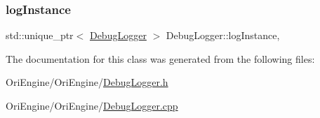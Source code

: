 \hypertarget{class_ori_engine_1_1_debug_logger_a4ce97f44559d7b62a2e6a535b34ce3f5}{}\label{class_ori_engine_1_1_debug_logger_a4ce97f44559d7b62a2e6a535b34ce3f5} 
\subsubsection{\texorpdfstring{log\+Instance}{logInstance}}
{\footnotesize\ttfamily std\+::unique\+\_\+ptr$<$ \hyperlink{class_ori_engine_1_1_debug_logger}{Debug\+Logger} $>$ Debug\+Logger\+::log\+Instance\hspace{0.3cm}{\ttfamily [static]}, {\ttfamily [private]}}



The documentation for this class was generated from the following files\+:\begin{DoxyCompactItemize}
\item 
Ori\+Engine/\+Ori\+Engine/\hyperlink{_debug_logger_8h}{Debug\+Logger.\+h}\item 
Ori\+Engine/\+Ori\+Engine/\hyperlink{_debug_logger_8cpp}{Debug\+Logger.\+cpp}\end{DoxyCompactItemize}
